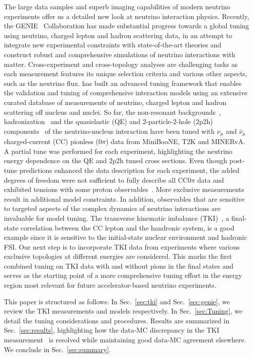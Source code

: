 The large data samples and superb imaging capabilities of modern neutrino experiments offer us a detailed new look at neutrino interaction physics.
Recently, the GENIE~\cite{Andreopoulos:2009rq, GENIE:2021npt} Collaboration has made substantial progress towards a global tuning using neutrino, charged lepton and hadron scattering data, in an attempt to integrate new experimental constraints with state-of-the-art theories and construct robust and comprehensive simulations of neutrino interactions with matter. 
Cross-experiment and cross-topology analyses are challenging tasks as each measurement features its unique selection criteria and various other  aspects, such as the neutrino flux. \genie has built an advanced tuning framework that enables the validation and tuning of comprehensive interaction models using an extensive curated database of measurements of neutrino, charged lepton and hadron scattering off nucleus and nuclei. So far, the non-resonant backgrounds~\cite{GENIE:2021zuu}, hadronization~\cite{GENIE:2021wox} and the quasielastic (QE) and 2-particle-2-hole (2p2h)  components~\cite{GENIE:2022qrc} of the neutrino-nucleus interaction have been tuned with $\nu_\mu$ and $\bar{\nu}_\mu$ charged-current (CC) pionless (0$\pi$) data from MiniBooNE, T2K and MINERvA. A partial tune was performed for each experiment, highlighting the neutrino energy dependence on the QE and 2p2h tuned cross sections. Even though post-tune predictions enhanced the data description for each experiment, the added degrees of freedom were not sufficient to fully describe all CC0$\pi$ data and exhibited tensions with some proton observables~\cite{GENIE:2022qrc}. More exclusive measurements result in additional model constraints. In addition, observables that are sensitive to targeted aspects of the complex dynamics of neutrino interactions are invaluable for model tuning. The transverse kinematic imbalance (TKI)~\cite{Lu:2015hea, Lu:2015tcr}, a final-state correlation between the CC lepton and the handronic system, is a good example since it is sensitive to the initial-state nuclear environment and hadronic FSI. Our next step is to incorporate TKI data from experiments where various exclusive topologies at different energies are considered. This marks the first combined tuning on TKI data with and without pions in the final states and serves as the starting point of a more comprehensive tuning effort in the energy region most relevant for future accelerator-based neutrino experiments.  

This paper is structured as follows: In Sec.~\ref{sec:tki} and Sec.~\ref{sec:genie}, we review the TKI measurements and \genie models respectively. In Sec.~\ref{sec:Tuning}, we detail the tuning considerations and procedures. Results are summarized in Sec.~\ref{sec:results}, highlighting how the data-MC discrepancy in the \minpiz TKI measurement~\cite{MINERvA:2020anu} is resolved while maintaining good data-MC agreement elsewhere. We conclude in Sec.~\ref{sec:summary}. 


